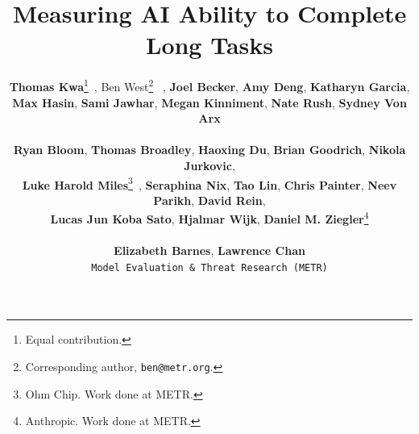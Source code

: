 \documentclass{article}
\begin{document}
\title{Measuring AI Ability to Complete Long Tasks}


\author{%
  \textbf{Thomas Kwa}\thanks{Equal contribution.}~, Ben West\thanks{Corresponding author, \texttt{ben@metr.org}.}\textsuperscript{~~}\footnotemark[1]  ,
  \textbf{Joel Becker}, \textbf{Amy Deng}, \textbf{Katharyn Garcia}, \\
  \textbf{Max Hasin}, \textbf{Sami Jawhar}, 
  \textbf{Megan Kinniment}, \textbf{Nate Rush}, \textbf{Sydney Von Arx}\\
  \\
  \textbf{Ryan Bloom}, \textbf{Thomas Broadley}, \textbf{Haoxing Du},  \textbf{Brian Goodrich}, \textbf{Nikola Jurkovic}, \\
 \textbf{Luke Harold Miles}\thanks{Ohm Chip. Work done at METR.}~, \textbf{Seraphina Nix}, \textbf{Tao Lin}, \textbf{Chris Painter}, \textbf{Neev Parikh}, \textbf{David Rein}, \\
 \textbf{Lucas Jun Koba Sato},  \textbf{Hjalmar Wijk}, \textbf{Daniel M. Ziegler}\thanks{Anthropic. Work done at METR.}
  \\
  \\
  \textbf{Elizabeth Barnes}, \textbf{Lawrence Chan}\\[2ex]
  \normalsize\texttt{Model Evaluation \& Threat Research (METR)}
}
\end{document}
